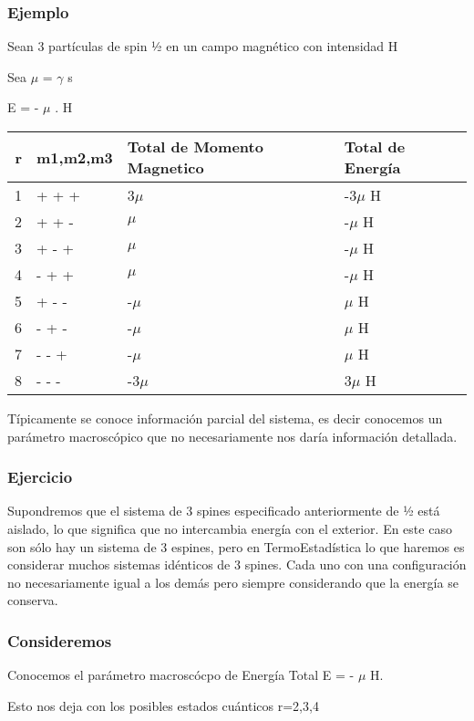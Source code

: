 \documentclass[11pt]{article}
\begin{document}
\subsubsection{Ejemplo}
\label{sec-1-2-1}
Sean 3 partículas de spin ½ en un campo magnético con intensidad H


Sea $\mu$ = $\gamma$ s

E = - $\mu$ . H

\begin{center}
\begin{tabular}{rlll}
r & m1,m2,m3 & Total de Momento Magnetico & Total de Energía\\
\hline
1 & + + + & 3$\mu$ & -3$\mu$ H\\
2 & + + - & $\mu$ & -$\mu$ H\\
3 & + - + & $\mu$ & -$\mu$ H\\
4 & - + + & $\mu$ & -$\mu$ H\\
5 & + - - & -$\mu$ & $\mu$ H\\
6 & - + - & -$\mu$ & $\mu$ H\\
7 & - - + & -$\mu$ & $\mu$ H\\
8 & - - - & -3$\mu$ & 3$\mu$ H\\
\end{tabular}
\end{center}

 Típicamente se conoce información parcial del sistema, es decir
conocemos un parámetro macroscópico que no necesariamente nos daría
información detallada.

\subsubsection{Ejercicio}
\label{sec-1-2-2}
Supondremos que el sistema de 3 spines especificado anteriormente de ½
está aislado, lo que significa que no intercambia energía con el
exterior. En este caso son sólo hay un sistema de 3 espines, pero en
TermoEstadística lo que haremos es considerar muchos sistemas
idénticos de 3 spines. Cada uno con una configuración no
necesariamente igual a los demás pero siempre considerando que la
energía se conserva.

\subsubsection{Consideremos}
\label{sec-1-2-3}
Conocemos el parámetro macroscócpo de Energía Total E = - $\mu$ H.

Esto nos deja con los posibles estados cuánticos r=2,3,4
\end{document}
